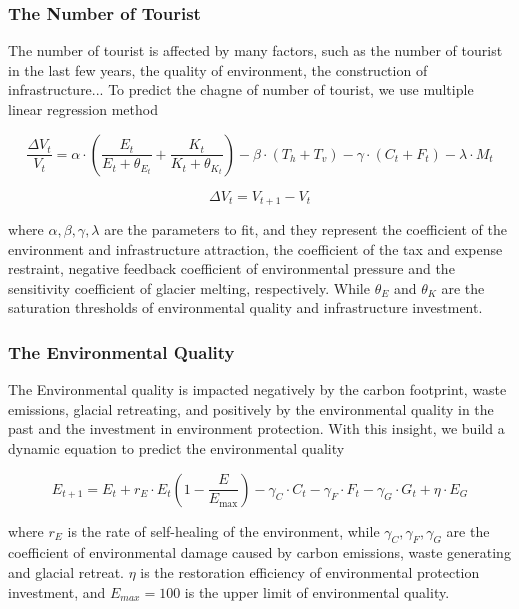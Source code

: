 \documentclass{mcmthesis}
\begin{document}
\subsubsection{The Number of Tourist}
The number of tourist is affected by many factors, such as the number of tourist in the last few years, 
the quality of environment, the construction of infrastructure... To predict the chagne of number of tourist,
we use multiple linear regression method

\begin{equation}
  \frac{\Delta V_t}{V_t} = \alpha\cdot\left(\frac{E_t}{E_t+\theta_{E_t}}+\frac{K_t}{K_t+\theta_{K_t}}\right) - \beta\cdot(T_h+T_v) - \gamma\cdot(C_t+F_t) - \lambda\cdot M_t
\end{equation}

\begin{equation}
  \Delta V_t = V_{t+1} - V_t
\end{equation}

where $\alpha, \beta, \gamma, \lambda$ are the parameters to fit, and they represent 
the coefficient of the environment and infrastructure attraction, the coefficient of the tax and expense restraint,
negative feedback coefficient of environmental pressure and the sensitivity coefficient of glacier melting, respectively.
While $\theta_E$ and $\theta_K$ are the saturation thresholds of environmental quality and infrastructure investment.

\subsubsection{The Environmental Quality}
The Environmental quality is impacted negatively by the carbon footprint, waste emissions, glacial retreating, and 
positively by the environmental quality in the past and the investment in environment protection. With this
insight, we build a dynamic equation to predict the environmental quality

\begin{equation}
  E_{t+1} = E_t + r_E \cdot E_t \left(1 - \frac{E}{E_{\text{max}}}\right) - \gamma_C \cdot C_t - \gamma_F \cdot F_t - \gamma_G \cdot G_t + \eta \cdot E_G
\end{equation}

where $r_E$ is the rate of self-healing of the environment, while $\gamma_C, \gamma_F, \gamma_G$ are the coefficient of 
environmental damage caused by carbon emissions, waste generating and glacial retreat. $\eta$ is the restoration efficiency of 
environmental protection investment, and $E_{max} = 100$ is the upper limit of environmental quality.
\end{document}
